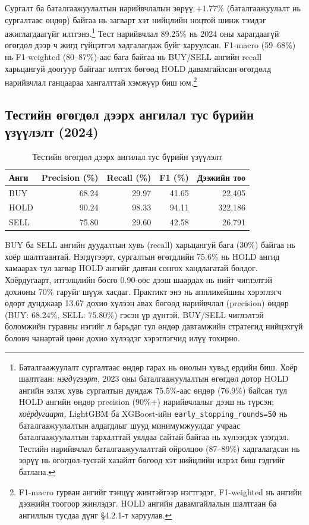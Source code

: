 Сургалт ба баталгаажуулалтын нарийвчлалын зөрүү $+1.77\%$ (баталгаажуулалт нь сургалтаас өндөр) байгаа нь загварт хэт нийцлийн ноцтой шинж тэмдэг ажиглагдаагүйг илтгэнэ.\footnote{Баталгаажуулалт сургалтаас өндөр гарах нь онолын хувьд ердийн биш. Хоёр шалтгаан: \emph{нэгдүгээрт,} 2023 оны баталгаажуулалтын өгөгдөл дотор HOLD ангийн эзлэх хувь сургалтын дундаж 75.5\%-аас өндөр (76.9\%) байсан тул HOLD ангийн өндөр precision (90\%+) нарийвчлалыг дээш нь түрсэн; \emph{хоёрдугаарт,} LightGBM ба XGBoost-ийн \texttt{early\_stopping\_rounds=50} нь баталгаажуулалтын алдагдлыг шууд минимумжуулдаг учраас баталгаажуулалтын тархалттай уялдаа сайтай байгаа нь хүлээгдэх үзэгдэл. Тестийн нарийвчлал баталгаажуулалттай ойролцоо (87--89\%) хадгалагдсан нь зөрүү нь өгөгдөл-тусгай хазайлт бөгөөд хэт нийцлийн илрэл биш гэдгийг батлана.} Тест нарийвчлал 89.25\% нь 2024 оны харагдаагүй өгөгдөл дээр ч жигд гүйцэтгэл хадгалагдаж буйг харуулсан. F1-macro (59--68\%) нь F1-weighted (80--87\%)-аас бага байгаа нь BUY/SELL ангийн recall харьцангуй доогуур байгааг илтгэх бөгөөд HOLD давамгайлсан өгөгдөлд нарийвчлал ганцаараа хангалттай хэмжүүр биш юм.\footnote{F1-macro гурван ангийг тэнцүү жинтэйгээр нэгтгэдэг, F1-weighted нь ангийн дээжийн тоогоор жинлэдэг. HOLD ангийн давамгайлалын шалтгаан ба ангиллын тусдаа дүнг §4.2.1-т харуулав.}

\subsection{Тестийн өгөгдөл дээрх ангилал тус бүрийн үзүүлэлт (2024)}

\begin{table}[H]
\centering
\caption{Тестийн өгөгдөл дээрх ангилал тус бүрийн үзүүлэлт}
\label{tab:per_class_metrics}
\renewcommand{\arraystretch}{1.20}
\setlength{\tabcolsep}{4pt}
\begin{tabular}{|l|r|r|r|r|}
\hline
\textbf{Анги} & \textbf{Precision (\%)} & \textbf{Recall (\%)} & \textbf{F1 (\%)} & \textbf{Дээжийн тоо} \\ \hline
BUY     & 68.24 & 29.97 & 41.65 & 22{,}405 \\ \hline
HOLD    & 90.24 & 98.33 & 94.11 & 322{,}186 \\ \hline
SELL    & 75.80 & 29.60 & 42.58 & 26{,}791 \\ \hline
\end{tabular}
\end{table}

BUY ба SELL ангийн дуудалтын хувь (recall) харьцангуй бага (30\%) байгаа нь хоёр шалтгаантай. Нэгдүгээрт, сургалтын өгөгдлийн 75.6\% нь HOLD ангид хамаарах тул загвар HOLD ангийг давтан сонгох хандлагатай болдог. Хоёрдугаарт, итгэлцлийн босго 0.90-өөс дээш шаардах нь нийт чиглэлтэй дохионы 70\% гаруйг шүүж хасдаг. Практикт энэ нь аппликейшны хэрэглэгч өдөрт дунджаар 13.67 дохио хүлээн авах бөгөөд нарийвчлал (precision) өндөр (BUY: 68.24\%, SELL: 75.80\%) гэсэн үр дүнтэй. BUY/SELL чиглэлтэй боломжийн гуравны нэгийг л барьдаг тул өндөр давтамжийн стратегид нийцэхгүй боловч чанартай цөөн дохио хүлээдэг хэрэглэгчид илүү тохирно.

